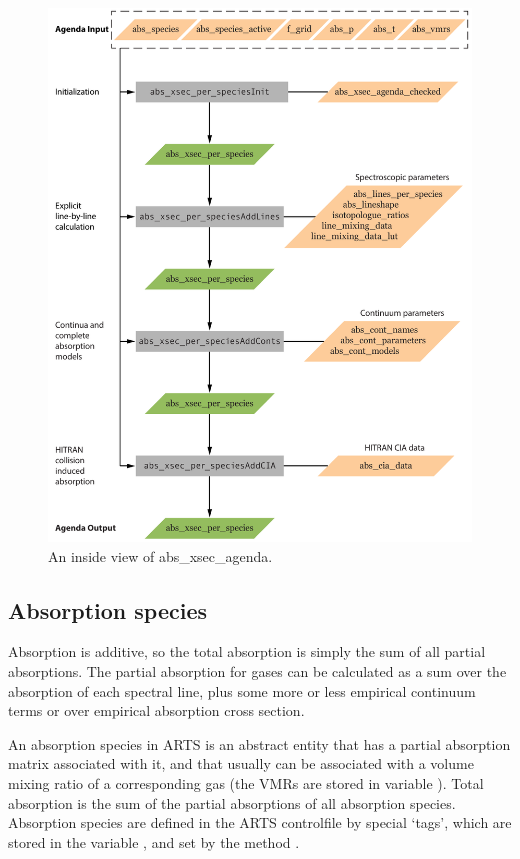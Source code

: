 \begin{figure}
 \begin{center}
  \includegraphics[scale=0.7]{abs_xsec_agenda}
  \caption{An inside view of abs\_xsec\_agenda.
  }
  \label{fig:absorption:xsec_inside}
 \end{center}
\end{figure}


\subsection{Absorption species}

Absorption is additive, so the total absorption is simply the sum of
all partial absorptions.  The partial absorption for gases can be calculated
as a sum over the absorption of each spectral line, plus some more or less
empirical continuum terms or over empirical absorption cross section.

An absorption species in ARTS is an abstract entity that has a partial
absorption matrix associated with it, and that usually can be
associated with a volume mixing ratio of a corresponding gas (the VMRs
are stored in variable ). Total absorption is the
sum of the partial absorptions of all absorption species. Absorption
species are defined in the ARTS controlfile by special `tags', which
are stored in the variable , and set by the
method .

